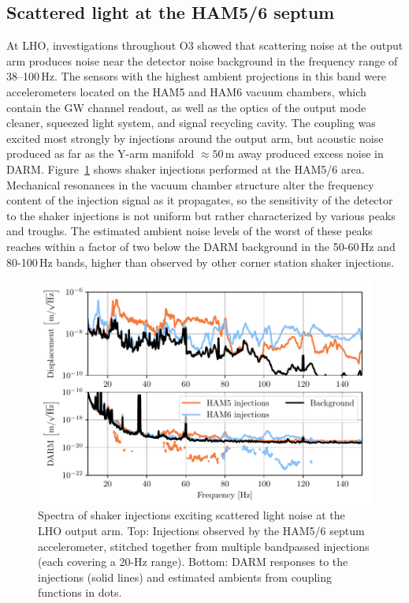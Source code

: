 \subsection{Scattered light at the HAM5/6 septum}\label{sec:vib-septum}

At \ac{LHO}, investigations throughout \ac{O3} showed that scattering noise at the output arm produces noise near the detector noise background in the frequency range of 38--100\,Hz.
The sensors with the highest ambient projections in this band were accelerometers located on the HAM5 and HAM6 vacuum chambers, which contain the \ac{GW} channel readout, as well as the optics of the output mode cleaner, squeezed light system, and signal recycling cavity.
The coupling was excited most strongly by injections around the output arm, but acoustic noise produced as far as the Y-arm manifold $\approx 50$\,m away produced excess noise in \ac{DARM}.
Figure~\ref{fig:vib-septum-shaker} shows shaker injections performed at the HAM5/6 area.
Mechanical resonances in the vacuum chamber structure alter the frequency content of the injection signal as it propagates, so the sensitivity of the detector to the shaker injections is not uniform but rather characterized by various peaks and troughs.
The estimated ambient noise levels of the worst of these peaks reaches within a factor of two below the DARM background in the 50-60\,Hz and 80-100\,Hz bands, higher than observed by other corner station shaker injections.

\begin{figure}[htb]
	\includegraphics{figures/noise-studies/vib-septum-shaker.pdf}
	\caption[Spectra of shaker injections exciting scattered light noise at the LHO output arm.]
	{Spectra of shaker injections exciting scattered light noise at the LHO output arm.
	 Top: Injections observed by the HAM5/6 septum accelerometer, stitched together from multiple bandpassed injections (each covering a 20-Hz range).
	 Bottom: DARM responses to the injections (solid lines) and estimated ambients from coupling functions in dots.}
	\label{fig:vib-septum-shaker}
\end{figure}

